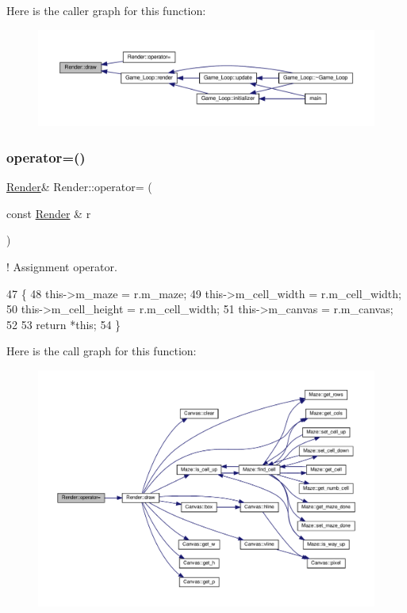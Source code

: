 Here is the caller graph for this function\+:\nopagebreak
\begin{figure}[H]
\begin{center}
\leavevmode
\includegraphics[width=350pt]{classRender_a67e9fdbd6725960fd59d6350e8cd17cc_icgraph}
\end{center}
\end{figure}
\mbox{\label{classRender_aeb62fc4c9d0a068daa1c848039bf7e6e}} 
\subsubsection{\texorpdfstring{operator=()}{operator=()}}
{\footnotesize\ttfamily \hyperlink{classRender}{Render}\& Render\+::operator= (\begin{DoxyParamCaption}\item[{const \hyperlink{classRender}{Render} \&}]{r }\end{DoxyParamCaption})\hspace{0.3cm}{\ttfamily [inline]}}



! Assignment operator. 


\begin{DoxyCode}
47         \{
48             this->m\_maze = r.m\_maze;
49             this->m\_cell\_width = r.m\_cell\_width;
50             this->m\_cell\_height = r.m\_cell\_width;
51             this->m\_canvas = r.m\_canvas;
52 
53             \textcolor{keywordflow}{return} *\textcolor{keyword}{this};
54         \}
\end{DoxyCode}
Here is the call graph for this function\+:\nopagebreak
\begin{figure}[H]
\begin{center}
\leavevmode
\includegraphics[width=350pt]{classRender_aeb62fc4c9d0a068daa1c848039bf7e6e_cgraph}
\end{center}
\end{figure}


